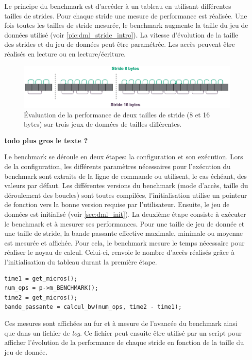         Le principe du benchmark est d'accéder à un tableau en utilisant différentes tailles de strides. Pour chaque stride une mesure de performance est réalisée. Une fois toutes les tailles de stride mesurée, le benchmark augmente la taille du jeu de données utilisé (voir \autoref{pic:dml_stride_intro}). La vitesse d'évolution de la taille des strides et du jeu de données peut être paramétrée. Les accès peuvent être réalisés en lecture ou en lecture/écriture.
       
        \begin{figure}[ht]
        \center
        \includegraphics[width=14cm]{images/dml_stride_intro.png}
        \caption{\label{pic:dml_stride_intro}Évaluation de la performance de deux tailles de stride (8 et 16 bytes) sur trois jeux de données de tailles différentes.}
        \end{figure}
        \textbf{todo plus gros le texte ?}


        Le benchmark se déroule en deux étapes: la configuration et son exécution.
        Lors de la configuration, les différents paramètres nécessaires pour l'exécution du benchmark sont extraits de la ligne de commande ou utilisent, le cas échéant, des valeurs par défaut. Les différentes versions du benchmark (mode d'accès, taille du déroulement des boucles) sont toutes compilées, l'initialisation utilise un pointeur de fonction vers la bonne version requise par l'utilisateur. Ensuite, le jeu de données est initialisé (voir \autoref{sec:dml_init}). 
        La deuxième étape consiste à exécuter le benchmark et à mesurer ses performances. Pour une taille de jeu de donnée et une taille de stride, la bande passante effective maximale, minimale ou moyenne est mesurée et affichée. Pour cela, le benchmark mesure le temps nécessaire pour réaliser le noyau de calcul. Celui-ci, renvoie le nombre d'accès réalisés grâce à l'initialisation du tableau durant la première étape. 
            \begin{verbatim}
time1 = get_micros();
num_ops = p->m_BENCHMARK();
time2 = get_micros();
bande_passante = calcul_bw(num_ops, time2 - time1);
            \end{verbatim}
            
        Ces mesures sont affichées au fur et à mesure de l'avancée du benchmark ainsi que dans un fichier de \textit{log}. Ce fichier peut ensuite être utilisé par un script pour afficher l'évolution de la performance de chaque stride en fonction de la taille du jeu de donnée. 
            
